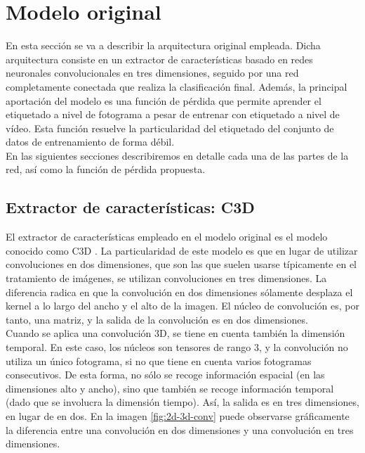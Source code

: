 \documentclass[../main.tex]{memoir}
\begin{document}
\section{Modelo original}

En esta sección se va a describir la arquitectura original empleada.
Dicha arquitectura consiste en un extractor de características basado
en redes neuronales convolucionales en tres dimensiones, seguido por
una red completamente conectada que realiza la clasificación
final. Además, la principal aportación del modelo es una función de
pérdida que permite aprender el etiquetado a nivel de fotograma a
pesar de entrenar con etiquetado a nivel de vídeo. Esta función
resuelve la particularidad del etiquetado del conjunto de datos de
entrenamiento de forma débil.\\

En las siguientes secciones describiremos en detalle cada una de las
partes de la red, así como la función de pérdida propuesta.

\subsection{Extractor de características: C3D}

El extractor de características empleado en el modelo original es el
modelo conocido como C3D \cite{tran2015learning}. La particularidad de
este modelo es que en lugar de utilizar convoluciones en dos
dimensiones, que son las que suelen usarse típicamente en el
tratamiento de imágenes, se utilizan convoluciones en tres
dimensiones. La diferencia radica en que la convolución en dos
dimensiones sólamente desplaza el kernel a lo largo del ancho y el
alto de la imagen. El núcleo de convolución es, por tanto, una matriz,
y la salida de la convolución es en dos dimensiones.\\

Cuando se aplica una convolución 3D, se tiene en cuenta también la
dimensión temporal. En este caso, los núcleos son tensores de rango 3,
y la convolución no utiliza un único fotograma, si no que tiene en
cuenta varios fotogramas consecutivos. De esta forma, no sólo se
recoge información espacial (en las dimensiones alto y ancho), sino
que también se recoge información temporal (dado que se involucra la
dimensión tiempo). Así, la salida es en tres dimensiones, en lugar de
en dos. En la imagen \ref{fig:2d-3d-conv} puede observarse
gráficamente la diferencia entre una convolución en dos dimensiones y
una convolución en tres dimensiones.\\
\end{document}
